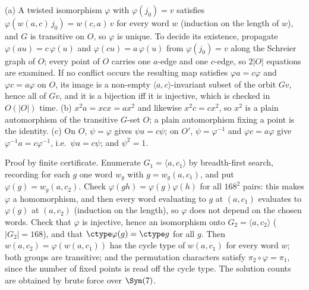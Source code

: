 \begin{thm}
\begin{defi}[\textsc{Order-3 Conjugacy}, $\Dzero$]
(a) A twisted isomorphism $\varphi$ with $\varphi(j_0)=v$ satisfies $\varphi(w(a,c)\,j_0)=w(c,a)\,v$ for every word $w$ (induction on the
length of $w$), and $G$ is transitive on $O$, so $\varphi$ is unique. To decide its existence, propagate $\varphi(au)=c\,\varphi(u)$ and
$\varphi(cu)=a\,\varphi(u)$ from $\varphi(j_0)=v$ along the Schreier graph of $O$; every point of $O$ carries one $a$-edge and one $c$-edge,
so $2|O|$ equations are examined. If no conflict occurs the resulting map satisfies $\varphi a=c\varphi$ and $\varphi c=a\varphi$ on $O$,
its image is a non-empty $\langle a,c\rangle$-invariant subset of the orbit $Gv$, hence all of $Gv$, and it is a bijection iff it is
injective, which is checked in $O(|O|)$ time. (b) $x^{2}a=xcx=ax^{2}$ and likewise $x^{2}c=cx^{2}$, so $x^{2}$ is a plain automorphism of the
transitive $G$-set $O$; a plain automorphism fixing a point is the identity. (c) On $O$, $\psi=\varphi$ gives $\psi a=c\psi$; on $O'$,
$\psi=\varphi^{-1}$ and $\varphi c=a\varphi$ give $\varphi^{-1}a=c\varphi^{-1}$, i.e.\ $\psi a=c\psi$; and $\psi^{2}=1$.

Proof by finite certificate. Enumerate $G_1=\langle a,c_1\rangle$ by breadth-first search, recording for each $g$ one word $w_g$ with
$g=w_g(a,c_1)$, and put $\varphi(g)=w_g(a,c_2)$. Check $\varphi(gh)=\varphi(g)\varphi(h)$ for all $168^{2}$ pairs: this makes $\varphi$ a
homomorphism, and then every word evaluating to $g$ at $(a,c_1)$ evaluates to $\varphi(g)$ at $(a,c_2)$ (induction on the length), so
$\varphi$ does not depend on the chosen words. Check that $\varphi$ is injective, hence an isomorphism onto $G_2=\langle a,c_2\rangle$
($|G_2|=168$), and that $\ctype\varphi(g)=\ctype g$ for all $g$. Then $w(a,c_2)=\varphi(w(a,c_1))$ has the cycle type of $w(a,c_1)$ for
every word $w$; both groups are transitive; and the permutation characters satisfy $\pi_2\circ\varphi=\pi_1$, since the number of fixed
points is read off the cycle type. The solution counts are obtained by brute force over $\Sym(7)$.


\end{defi}
\end{thm}
